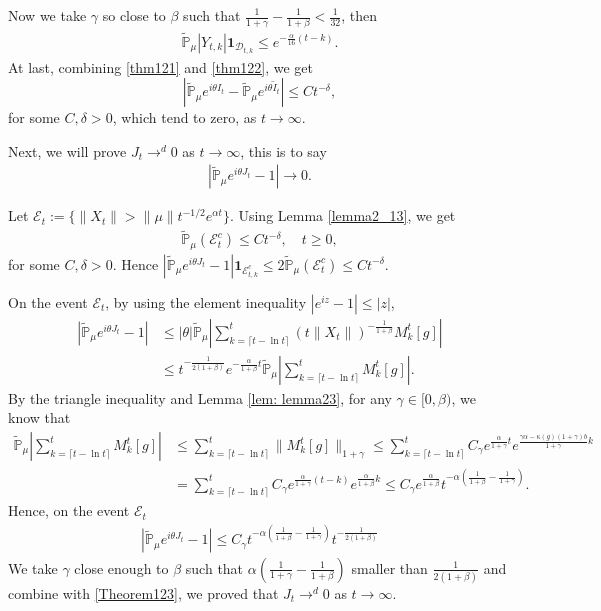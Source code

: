 \documentclass[12pt, a4paper]{amsart}
\theoremstyle{definition}
\numberwithin{equation}{section}
\begin{document}
Now we take $\gamma$ so close to $\beta$ such that $\frac{1}{1+\gamma}-\frac{1}{1+\beta}<\frac{1}{32}$, then
\begin{align}
     \mathbb{\tilde{P}}_{\mu}|Y_{t,k}|\mathbf{1}_{\mathcal{D}_{t,k}}\leq  e^{-\frac{\alpha}{16}(t-k)}.\label{thm122}
\end{align}
At last, combining \eqref{thm121} and \eqref{thm122}, we get
$$\left|\mathbb{\tilde{P}}_{\mu}e^{i\theta I_t}-\mathbb{\tilde{P}}_{\mu}e^{i\theta\tilde{I}_t}\right|\leq C t^{-\delta},$$
for some $C,\delta>0$, which tend to zero, as $t\rightarrow \infty$.

Next, we will prove $J_t \rightarrow^d 0$ as $t\rightarrow \infty$, this is to say
\begin{align*}
    \left|\mathbb{\tilde{P}}_{\mu}e^{i\theta J_t}-1\right|\rightarrow 0.
\end{align*}

Let $\mathcal{E}_t:=\{\|X_t\|>\|\mu\|t^{-1/2}e^{\alpha t}\}$. Using Lemma \eqref{lemma2_13}, we get
\begin{align}
    \mathbb{\tilde{P}}_{\mu}(\mathcal{E}^c_t)\leq C t^{-\delta}, \quad t\geq0,\label{Theorem123}
\end{align}
    for some $C,\delta>0$. Hence $\left|\mathbb{\tilde{P}}_{\mu}e^{i\theta J_t}-1\right|\mathbf{1}_{\mathcal{E}^c_{t,k}}\leq 2\mathbb{\tilde{P}}_{\mu}(\mathcal{E}^c_t)\leq Ct^{-\delta}$.

On the event $\mathcal{E}_t$, by using the element inequality $|e^{i z}-1|\leq |z|$,
\begin{align*}
    \left|\mathbb{\tilde{P}}_{\mu}e^{i\theta J_t}-1\right|&\leq|\theta| \mathbb{\tilde{P}}_{\mu}\left|\sum_{k=\lceil t-\ln t \rceil}^t \left(t\|X_t\|\right)^{-\frac{1}{1+\beta}}M_k^t[g]\right|\\
    &\leq t^{-\frac{1}{2(1+\beta)}}e^{-\frac{\alpha}{1+\beta}t}\mathbb{\tilde{P}}_{\mu}\left|\sum_{k=\lceil t-\ln t \rceil}^t M_k^t[g]\right|.
\end{align*}
By the triangle inequality and Lemma \ref{lem: lemma23}, for any $\gamma\in[0,\beta)$, we know that
\begin{align*}
    \mathbb{\tilde{P}}_{\mu}\left|\sum_{k=\lceil t-\ln t \rceil}^t M_k^t[g]\right|&\leq \sum_{k=\lceil t-\ln t \rceil}^t \|M_k^t[g]\|_{1+\gamma}\leq\sum_{k=\lceil t-\ln t \rceil}^t C_{\gamma}e^{\frac{\alpha}{1+\gamma}t}e^{\frac{\gamma \alpha-\kappa(g)(1+\gamma)b}{1+\gamma}k}\\
    &=\sum_{k=\lceil t-\ln t \rceil}^t C_{\gamma}e^{\frac{\alpha}{1+\gamma}(t-k)}e^{\frac{\alpha}{1+\beta}k}\leq C_{\gamma}e^{\frac{\alpha}{1+\beta}}t^{-\alpha(\frac{1}{1+\beta}-\frac{1}{1+\gamma})}.
\end{align*}
Hence, on the event $\mathcal{E}_t$
\begin{align*}
    \left|\mathbb{\tilde{P}}_{\mu}e^{i\theta J_t}-1\right|\leq C_{\gamma}t^{-\alpha(\frac{1}{1+\beta}-\frac{1}{1+\gamma})} t^{-\frac{1}{2(1+\beta)}}
\end{align*}
We take $\gamma$ close enough to $\beta$ such that $\alpha(\frac{1}{1+\gamma}-\frac{1}{1+\beta})$ smaller than $\frac{1}{2(1+\beta)}$ and combine with \eqref{Theorem123}, we proved that $J_t \rightarrow^d 0$ as $t\rightarrow \infty$.
\end{document}
